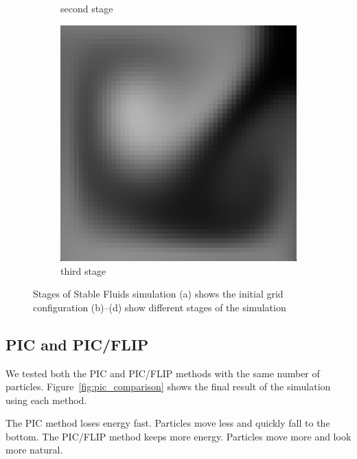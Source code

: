 \begin{figure}[h]
\begin{subfigure}[b]{0.2\textwidth}
        \caption{second stage}
    \end{subfigure}
    \hspace{1em}
    \begin{subfigure}[b]{0.2\textwidth}
        \includegraphics[width=\textwidth]{figures/grid50_3.png}
        \caption{third stage}
    \end{subfigure}
    \caption{Stages of Stable Fluids simulation 
    (a) shows the initial grid configuration
    (b)–(d) show different stages of the simulation}
    \label{fig:grid}
\end{figure}

\subsection{PIC and PIC/FLIP}

We tested both the PIC and PIC/FLIP methods with the same number of particles. Figure~\ref{fig:pic_comparison} shows the final result of the simulation using each method.

The PIC method loses energy fast. Particles move less and quickly fall to the bottom.
The PIC/FLIP method keeps more energy. Particles move more and look more natural.


